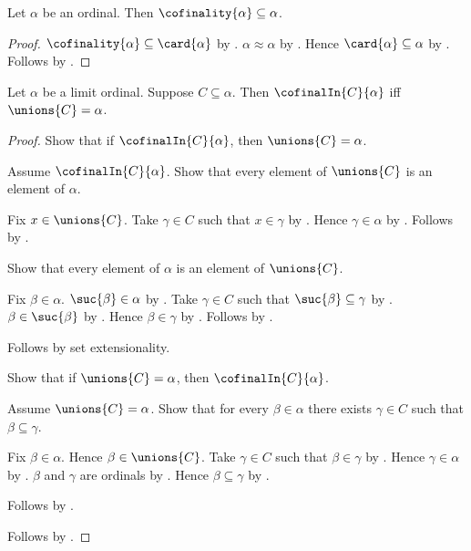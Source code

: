 \begin{proposition}\label{cofinality_subseteq_ordinal}
    Let $\alpha$ be an ordinal.
    Then $\cofinality{\alpha}\subseteq\alpha$.
\end{proposition}
\begin{proof}
    $\cofinality{\alpha}\subseteq\card{\alpha}$
        by .
    $\alpha\approx\alpha$ by .
    Hence $\card{\alpha}\subseteq\alpha$
        by .
    Follows by .
\end{proof}

\begin{theorem}\label{cofinal_in_limit_iff_union}
    Let $\alpha$ be a limit ordinal.
    Suppose $C\subseteq\alpha$.
    Then $\cofinalIn{C}{\alpha}$ iff $\unions{C}=\alpha$.
\end{theorem}
\begin{proof}
    Show that if $\cofinalIn{C}{\alpha}$, then
        $\unions{C}=\alpha$.
    \begin{subproof}
        Assume $\cofinalIn{C}{\alpha}$.
        Show that every element of $\unions{C}$ is an element of $\alpha$.
        \begin{subproof}
            Fix $x\in\unions{C}$.
            Take $\gamma\in C$ such that $x\in\gamma$
                by .
            Hence $\gamma\in\alpha$ by .
            Follows by .
        \end{subproof}
        Show that every element of $\alpha$ is an element of $\unions{C}$.
        \begin{subproof}
            Fix $\beta\in\alpha$.
            $\suc{\beta}\in\alpha$ by .
            Take $\gamma\in C$ such that $\suc{\beta}\subseteq\gamma$
                by .
            $\beta\in\suc{\beta}$ by .
            Hence $\beta\in\gamma$ by .
            Follows by .
        \end{subproof}
        Follows by set extensionality.
    \end{subproof}
    Show that if $\unions{C}=\alpha$, then
        $\cofinalIn{C}{\alpha}$.
    \begin{subproof}
        Assume $\unions{C}=\alpha$.
        Show that for every $\beta\in\alpha$ there exists $\gamma\in C$
            such that $\beta\subseteq\gamma$.
        \begin{subproof}
            Fix $\beta\in\alpha$.
            Hence $\beta\in\unions{C}$.
            Take $\gamma\in C$ such that $\beta\in\gamma$
                by .
            Hence $\gamma\in\alpha$ by .
            $\beta$ and $\gamma$ are ordinals
                by .
            Hence $\beta\subseteq\gamma$
                by .
        \end{subproof}
        Follows by .
    \end{subproof}
    Follows by \auto.
\end{proof}

